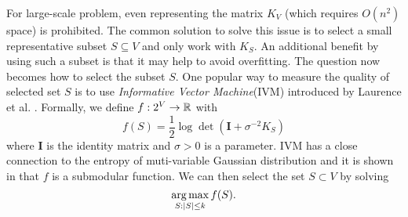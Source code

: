 For large-scale problem, even representing the matrix $K_V$ (which requires $O(n^2)$ space) is prohibited. The common solution to solve this issue is to select a small representative subset $S \subseteq V$ and only work with $K_S$. An additional benefit by using such a subset is that it may help to avoid overfitting. The question now becomes how to select the subset $S$. One popular way to measure the quality of selected set $S$ is to use \emph{Informative Vector Machine}(IVM) introduced by Laurence et al. \cite{LSH03}. Formally, we define $f: 2^V \rightarrow \mathbb{R}$ with
$$f(S) = \frac{1}{2} \log\det\left( \mathbf{I} + \sigma^{-2} K_S \right)$$
where $\mathbf{I}$ is the identity matrix and $\sigma > 0$ is a parameter. IVM has a close connection to the entropy of  muti-variable Gaussian distribution \cite{B14} and it is shown in \cite{S04,B14} that $f$ is a submodular function. We can then select the set $S\subset V$ by solving
$$\operatorname*{arg\,max}_{S:|S|\leq k} f(S).$$






